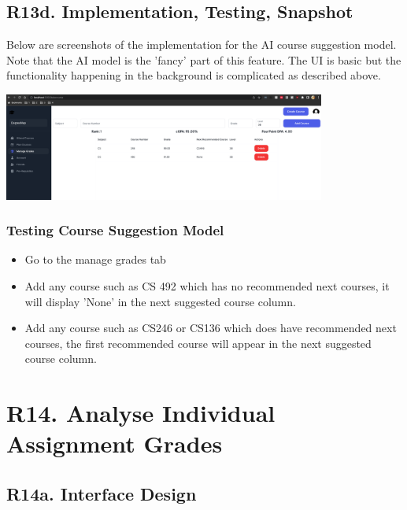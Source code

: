 \documentclass[12pt, a4paper]{article}
\begin{document}
\subsection*{R13d. Implementation, Testing, Snapshot}
Below are screenshots of the implementation for the AI course suggestion model. Note that the AI model is the 'fancy' part of this feature. The UI is basic but the functionality happening in the background is complicated as described above.
\begin{center}
     \includegraphics[width=400px]{images/R13/i1}
\end{center}
\subsubsection*{Testing Course Suggestion Model}
\begin{itemize}
    \item Go to the manage grades tab
    \item Add any course such as CS 492 which has no recommended next courses, it will display 'None' in the next suggested course column.
    \item Add any course such as CS246 or CS136 which does have recommended next courses, the first recommended course will appear in the next suggested course column.
\end{itemize}
\section*{R14. Analyse Individual Assignment Grades}
\label{sec:R14}
\subsection*{R14a. Interface Design}
\end{document}

